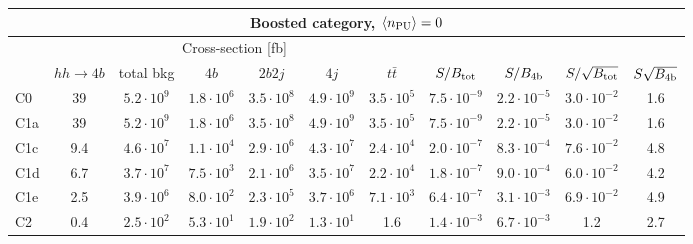 \begin{tabular}{|l|cc|cccc|cccc|}
  \hline
\multicolumn{11}{|c|}{Boosted category, $\left\langle n_{\rm PU}\right\rangle=0$}\\
\hline
&  \multicolumn{6}{c|}{Cross-section [fb]} &  &  & &  \\
   &  $hh\to 4b$ &  total bkg  &   $4b$    &  $2b2j$   &   $4j$    &
$t\bar{t}$ &
$S/B_{\rm tot}$ & $S/B_{\rm 4b}$ & $S/\sqrt{B_{\rm tot}}$ & $S\sqrt{B_{\rm 4b}}$ \\
  \hline
  \hline
C0      & 39  &   $5.2\cdot 10^9$   & $1.8\cdot 10^6$ & $3.5\cdot 10^8$ & $4.9\cdot 10^9$ & $3.5\cdot 10^5$  &   $7.5\cdot 10^{-9}$   & $2.2\cdot 10^{-5}$  &  $ 3.0\cdot 10^{-2}$   & 1.6 \\
 C1a     & 39  &   $5.2\cdot 10^9$   & $1.8\cdot 10^6$ & $3.5\cdot 10^8$ & $4.9\cdot 10^9$ & $3.5\cdot 10^5$  &   $7.5\cdot 10^{-9}$   & $2.2\cdot 10^{-5}$ &  $ 3.0\cdot 10^{-2}$   & 1.6  \\
 C1c     & 9.4  &   $4.6\cdot 10^7$   & $1.1\cdot 10^4$ & $2.9\cdot 10^6$ & $4.3\cdot 10^7$ & $2.4\cdot 10^4$ &   $2.0\cdot 10^{-7}$   & $8.3\cdot 10^{-4}$ &  $ 7.6\cdot 10^{-2}$   & 4.8 \\
 C1d     & 6.7  &   $3.7\cdot 10^7$   & $7.5\cdot 10^3$ & $2.1\cdot 10^6$ & $3.5\cdot 10^7$ & $2.2\cdot 10^4$ &   $1.8\cdot 10^{-7}$   & $9.0\cdot 10^{-4}$ &  $ 6.0\cdot 10^{-2}$   & 4.2  \\
 C1e     & 2.5  &   $3.9\cdot 10^6$   & $8.0\cdot 10^2$ & $2.3\cdot 10^5$ & $3.7\cdot 10^6$ & $7.1\cdot 10^3$   &   $6.4\cdot 10^{-7}$   & $3.1\cdot 10^{-3}$ &  $ 6.9\cdot 10^{-2}$   & 4.9\\
 C2      & 0.4  &   $2.5\cdot 10^2$   & $5.3\cdot 10^1$ & $1.9\cdot 10^2$ & $1.3\cdot 10^1$ & 1.6  &   $1.4\cdot 10^{-3}$   & $6.7\cdot 10^{-3}$ &   1.2   & 2.7  \\
\hline
\end{tabular}
